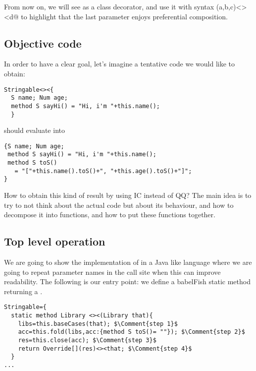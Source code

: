 From now on, we will see \Q@Override@ as a class decorator, and
use it with syntax \Q@Override(a,b,c)<><d@ to highlight that the last parameter enjoys preferential composition.

\subsection*{Objective code}
In order to have a clear goal,
let's imagine a tentative code we would like to obtain:

\begin{lstlisting}
Stringable<><{
  S name; Num age;
  method S sayHi() = "Hi, i'm "+this.name();
  }
\end{lstlisting}

\noindent should evaluate into

\begin{lstlisting}
{S name; Num age;
 method S sayHi() = "Hi, i'm "+this.name();
 method S toS() 
   = "["+this.name().toS()+", "+this.age().toS()+"]";
}
\end{lstlisting}

How to obtain this kind of result by using IC instead of QQ?
The main idea is to try to not think about the actual code but about
its behaviour, and how to decompose it into functions, and how to
put these functions together.



\subsection*{Top level operation}
We are going to show the implementation of \Q@Stringable@ in a Java like language where
we are going to repeat parameter names in the call site when this can improve readability.
The following is our entry point: we define a babelFish static method
returning a \Q@Library@.

\begin{lstlisting}
Stringable={
  static method Library <><(Library that){
    libs=this.baseCases(that); $\Comment{step 1}$
    acc=this.fold(libs,acc:{method S toS()= ""}); $\Comment{step 2}$
    res=this.close(acc); $\Comment{step 3}$
    return Override[](res)<><that; $\Comment{step 4}$
  }
...
\end{lstlisting}



